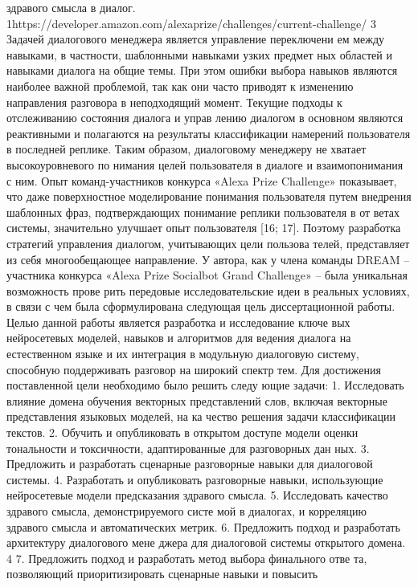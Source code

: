 здравого смысла в диалог.
1https://developer.amazon.com/alexaprize/challenges/current-challenge/
3
Задачей диалогового менеджера является управление переключени
ем между навыками, в частности, шаблонными навыками узких предмет
ных областей и навыками диалога на общие темы. При этом ошибки
выбора навыков являются наиболее важной проблемой, так как они
часто приводят к изменению направления разговора в неподходящий
момент. Текущие подходы к отслеживанию состояния диалога и управ
лению диалогом в основном являются реактивными и полагаются на
результаты классификации намерений пользователя в последней реплике.
Таким образом, диалоговому менеджеру не хватает высокоуровневого по
нимания целей пользователя в диалоге и взаимопонимания с ним. Опыт
команд-участников конкурса «Alexa Prize Challenge» показывает, что даже
поверхностное моделирование понимания пользователя путем внедрения
шаблонных фраз, подтверждающих понимание реплики пользователя в от
ветах системы, значительно улучшает опыт пользователя [16; 17]. Поэтому
разработка стратегий управления диалогом, учитывающих цели пользова
телей, представляет из себя многообещающее направление.
У автора, как у члена команды DREAM – участника конкурса «Alexa
Prize Socialbot Grand Challenge» – была уникальная возможность прове
рить передовые исследовательские идеи в реальных условиях, в связи с
чем была сформулирована следующая цель диссертационной работы.
Целью данной работы является разработка и исследование ключе
вых нейросетевых моделей, навыков и алгоритмов для ведения диалога
на естественном языке и их интеграция в модульную диалоговую систему,
способную поддерживать разговор на широкий спектр тем.
Для достижения поставленной цели необходимо было решить следу
ющие задачи:
1. Исследовать влияние домена обучения векторных представлений
слов, включая векторные представления языковых моделей, на ка
чество решения задачи классификации текстов.
2. Обучить и опубликовать в открытом доступе модели оценки
тональности и токсичности, адаптированные для разговорных дан
ных.
3. Предложить и разработать сценарные разговорные навыки для
диалоговой системы.
4. Разработать и опубликовать разговорные навыки, использующие
нейросетевые модели предсказания здравого смысла.
5. Исследовать качество здравого смысла, демонстрируемого систе
мой в диалогах, и корреляцию здравого смысла и автоматических
метрик.
6. Предложить подход и разработать архитектуру диалогового мене
джера для диалоговой системы открытого домена.
4
7. Предложить подход и разработать метод выбора финального отве
та, позволяющий приоритизировать сценарные навыки и повысить
